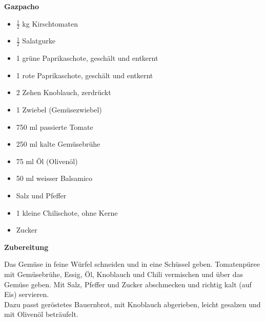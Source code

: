 
\parindent0pt	

\pagestyle{empty}


\textbf{{\LARGE Gazpacho}}%


\hrulefill
\vspace*{\fill}
\begin{multicols}{2}	


\begin{itemize}
\item $\frac{1}{2}$ kg 	Kirschtomaten
\item $\frac{1}{2}$ 	Salatgurke
\item 1  	grüne Paprikaschote, geschält und entkernt
\item 1  	rote Paprikaschote, geschält und entkernt
\item 2 Zehen 	Knoblauch, zerdrückt
\item 1  	Zwiebel (Gemüsezwiebel)
\item 750 ml 	passierte Tomate 
\item 250 ml 	kalte Gemüsebrühe
\item 75 ml 	Öl (Olivenöl)
\item 50 ml 	weisser Balsamico
\item Salz und Pfeffer
\item 1 kleine 	Chilischote, ohne Kerne
\item Zucker 
\end{itemize}

\end{multicols}
\vfill
\newpage
\textbf{{\LARGE Zubereitung}}%

\hrulefill

\vspace*{\fill}
\begin{multicols}{2}



Das Gemüse in feine Würfel schneiden und in eine Schüssel geben. 
Tomatenpüree mit Gemüsebrühe, Essig, Öl, Knoblauch und Chili vermischen und über das Gemüse geben. 
Mit Salz, Pfeffer und Zucker abschmecken und richtig kalt (auf Eis) servieren.\\

Dazu passt geröstetes Bauernbrot, mit Knoblauch abgerieben, leicht gesalzen und mit Olivenöl beträufelt. 


\end{multicols}
\vfill
